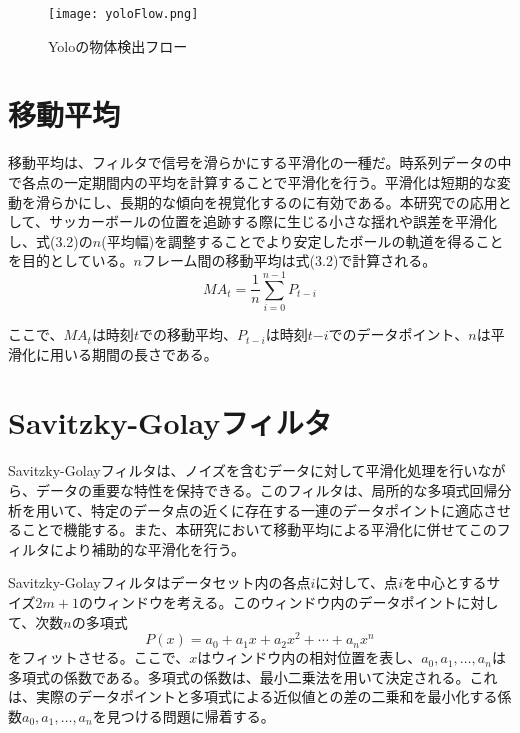 \documentclass[11pt,a4j]{jreport}
\begin{document}
\begin{figure}[H]
    \centering
    \texttt{[image: yoloFlow.png]}
    \caption{Yoloの物体検出フロー}
    \label{fig:ラベル}
\end{figure}

\section{移動平均}
移動平均は、フィルタで信号を滑らかにする平滑化の一種だ。時系列データの中で各点の一定期間内の平均を計算することで平滑化を行う。\cite{計測システム}平滑化は短期的な変動を滑らかにし、長期的な傾向を視覚化するのに有効である。本研究での応用として、サッカーボールの位置を追跡する際に生じる小さな揺れや誤差を平滑化し、式(3.2)の$n$(平均幅)を調整することでより安定したボールの軌道を得ることを目的としている。$n$フレーム間の移動平均は式(3.2)で計算される。
\begin{equation}
    MA_t = \frac{1}{n} \sum_{i=0}^{n-1} P_{t-i}
\end{equation}

ここで、$MA_t$は時刻$t$での移動平均、$P_{t−i}$は時刻$t$−$i$でのデータポイント、$n$は平滑化に用いる期間の長さである。

\section{Savitzky-Golayフィルタ}
Savitzky-Golayフィルタは、ノイズを含むデータに対して平滑化処理を行いながら、データの重要な特性を保持できる。\cite{SavitzkyOri}このフィルタは、局所的な多項式回帰分析を用いて、特定のデータ点の近くに存在する一連のデータポイントに適応させることで機能する。また、本研究において移動平均による平滑化に併せてこのフィルタにより補助的な平滑化を行う。

Savitzky-Golayフィルタはデータセット内の各点$i$に対して、点$i$を中心とするサイズ$2m + 1$のウィンドウを考える。このウィンドウ内のデータポイントに対して、次数$n$の多項式
\[
    P(x) = a_0 + a_1x + a_2x^2 + \cdots + a_nx^n
\]
をフィットさせる。ここで、$x$はウィンドウ内の相対位置を表し、$a_0, a_1, \ldots, a_n$は多項式の係数である。多項式の係数は、最小二乗法を用いて決定される。これは、実際のデータポイントと多項式による近似値との差の二乗和を最小化する係数$a_0, a_1, \ldots, a_n$を見つける問題に帰着する。

\end{document}
